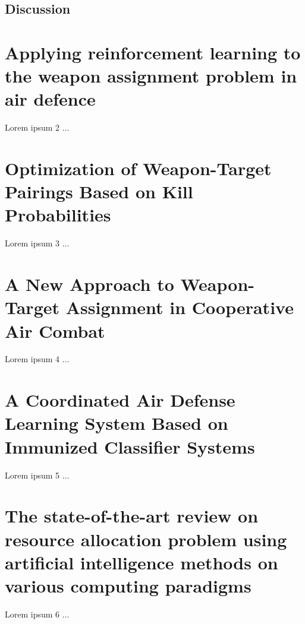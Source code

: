 \documentclass[12pt]{article} %
\begin{document}
\subsection*{Discussion}


\section*{Applying reinforcement learning to the weapon assignment problem in air defence \cite{rl_wa_airDefence_mouton_2011}}
Lorem ipsum 2 $\ldots$


\section*{Optimization of Weapon-Target Pairings Based on Kill Probabilities \cite{killProbs_bogdanowicz_2013}}
Lorem ipsum 3 $\ldots$


\section*{A New Approach to Weapon-Target Assignment in Cooperative Air Combat \cite{swarmHarmony_chang_2017}}
Lorem ipsum 4 $\ldots$


\section*{A Coordinated Air Defense Learning System Based on Immunized Classifier Systems \cite{immunized_nantogma_2021}}
Lorem ipsum 5 $\ldots$


\section*{The state-of-the-art review on resource allocation problem using artificial intelligence methods on various computing paradigms \cite{resourceAlloc_joloudari_2022}}
Lorem ipsum 6 $\ldots$




\end{document}
